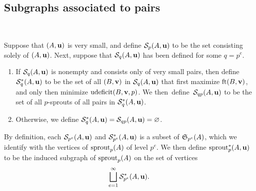 \documentclass[11pt]{amsart}
\newcommand{\udeficit}{\operatorname{udeficit}}
\renewcommand{\S}{\mathcal{S}}
\begin{document}
\subsection{Subgraphs associated to pairs}

\ 

\begin{definition}
   Suppose that $(A,\mathbf{u})$ is very small, and define $\S_p(A,\vv{u})$ to be the set consisting solely of $(A,\mathbf{u})$.
   Next, suppose that $\S_q(A,\vv{u})$ has been defined for some $q=p^e$.
   \begin{enumerate}
      \item If $\S_q(A,\vv{u})$ is nonempty and consists only of very small pairs, then define $\S^{\ast}_q(A,\vv{u})$ to be the set of all $(B,\mathbf{v})$ in $\S_q(A,\vv{u})$ that first maximize $\operatorname{ft}(B, \mathbf{v})$, and only then minimize $\udeficit(B,\vv{v},p)$.  We then~define~$\S_{qp}(A,\vv{u})$ to be the set of all $p$-sprouts of all pairs in $\S^{\ast}_q(A,\vv{u})$.
      \item Otherwise, we define $\S_q^{\ast}(A,\vv{u})=\S_{qp}(A,\vv{u}) = \emptyset$.
   \end{enumerate}
   By definition, each $\S_{p^e}(A,\vv{u})$ and $\S^{\ast}_{p^e}(A,\vv{u})$ is a subset of $\mathfrak{S}_{p^e}(A)$, which we identify with the vertices of $\operatorname{sprout}_p(A)$ of level $p^e$.
   We then define $\operatorname{sprout}_p^{\ast}(A,\mathbf{u})$ to be the induced subgraph of $\operatorname{sprout}_p(A)$ on the set of vertices
   \[ \bigsqcup_{e=1}^{\infty} \S^{\ast}_{p^e}(A,\vv{u}). \]
\end{definition}
\end{document}
